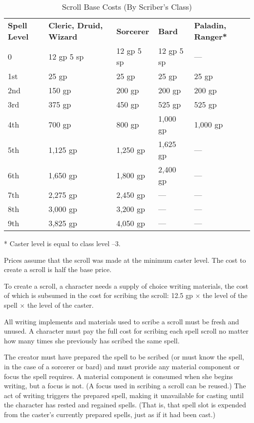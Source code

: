 \begin{table}[]
\sffamily
\caption{Scroll Base Costs (By Scriber's Class)}
\begin{tabular}{lllll}
\textbf{Spell Level} & \textbf{Cleric, Druid, Wizard} & \textbf{Sorcerer}   & \textbf{Bard}       & \textbf{Paladin, Ranger*} \\
0           & 12 gp 5 sp            & 12 gp 5 sp & 12 gp 5 sp & —                \\
1st         & 25 gp                 & 25 gp      & 25 gp      & 25 gp            \\
2nd         & 150 gp                & 200 gp     & 200 gp     & 200 gp           \\
3rd         & 375 gp                & 450 gp     & 525 gp     & 525 gp           \\
4th         & 700 gp                & 800 gp     & 1,000 gp   & 1,000 gp         \\
5th         & 1,125 gp              & 1,250 gp   & 1,625 gp   & —                \\
6th         & 1,650 gp              & 1,800 gp   & 2,400 gp   & —                \\
7th         & 2,275 gp              & 2,450 gp   & —          & —                \\
8th         & 3,000 gp              & 3,200 gp   & —          & —                \\
9th         & 3,825 gp              & 4,050 gp   & —          & —               
\end{tabular}
* Caster level is equal to class level --3.
\end{table}
Prices assume that the scroll was made at the minimum caster level. The cost to create a scroll is half the base price.
				
To create a scroll, a character needs a supply of choice writing materials, the cost of which is subsumed in the cost for scribing the scroll: 12.5 gp \mbox{$\times$} the level of the spell \mbox{$\times$} the level of the caster.
				
All writing implements and materials used to scribe a scroll must be fresh and unused. A character must pay the full cost for scribing each spell scroll no matter how many times she previously has scribed the same spell.
				
The creator must have prepared the spell to be scribed (or must know the spell, in the case of a sorcerer or bard) and must provide any material component or focus the spell requires. A material component is consumed when she begins writing, but a focus is not. (A focus used in scribing a scroll can be reused.) The act of writing triggers the prepared spell, making it unavailable for casting until the character has rested and regained spells. (That is, that spell slot is expended from the caster's currently prepared spells, just as if it had been cast.)
				
